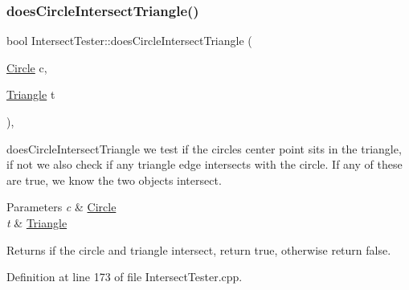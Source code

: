 \subsubsection{\texorpdfstring{does\+Circle\+Intersect\+Triangle()}{doesCircleIntersectTriangle()}}
{\footnotesize\ttfamily bool Intersect\+Tester\+::does\+Circle\+Intersect\+Triangle (\begin{DoxyParamCaption}\item[{\hyperlink{class_circle}{Circle}}]{c,  }\item[{\hyperlink{class_triangle}{Triangle}}]{t }\end{DoxyParamCaption})\hspace{0.3cm}{\ttfamily [static]}, {\ttfamily [private]}}



does\+Circle\+Intersect\+Triangle we test if the circle\textquotesingle{}s center point sits in the triangle, if not we also check if any triangle edge intersects with the circle. If any of these are true, we know the two objects intersect. 


\begin{DoxyParams}{Parameters}
{\em c} & \hyperlink{class_circle}{Circle} \\
\hline
{\em t} & \hyperlink{class_triangle}{Triangle} \\
\hline
\end{DoxyParams}
\begin{DoxyReturn}{Returns}
if the circle and triangle intersect, return true, otherwise return false. 
\end{DoxyReturn}


Definition at line 173 of file Intersect\+Tester.\+cpp.


